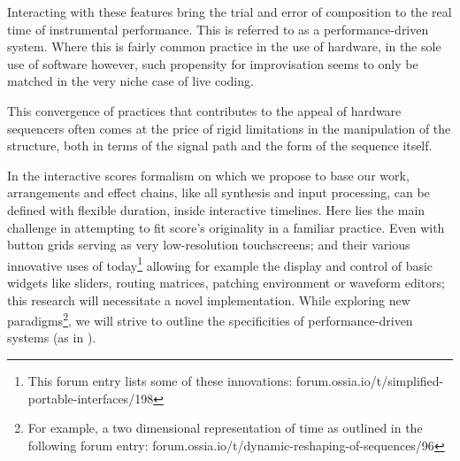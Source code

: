\documentclass[journal,onecolumn]{IEEEtran}
\begin{document}
Interacting with these features bring the trial and error of composition to the real time of instrumental performance. This is referred to as a performance-driven system\cite{nash:liveness}. Where this is fairly common practice in the use of hardware, in the sole use of software however, such propensity for improvisation seems to only be matched in the very niche case of live coding\cite{blackwell:livecoding}. 

This convergence of practices that contributes to the appeal of hardware sequencers often comes at the price of rigid limitations in the manipulation of the structure, both in terms of the signal path and the form of the sequence itself.

In the interactive scores formalism on which we propose to base our work, arrangements and effect chains, like all synthesis and input processing, can be defined with flexible duration, inside interactive timelines. Here lies the main challenge in attempting to fit score's originality in a familiar practice. Even with button grids serving as very low-resolution touchscreens;
and their various innovative uses of today\footnote{This forum entry lists some of these innovations: forum.ossia.io/t/simplified-portable-interfaces/198} allowing for example the display and control of basic widgets like sliders, routing matrices, patching environment or waveform editors; this research will necessitate a novel implementation. While exploring new paradigms\footnote{For example, a two dimensional representation of time as outlined in the following forum entry: forum.ossia.io/t/dynamic-reshaping-of-sequences/96}, we will strive to outline the specificities of performance-driven systems (as in \cite{nash:liveness}).

\end{document}
